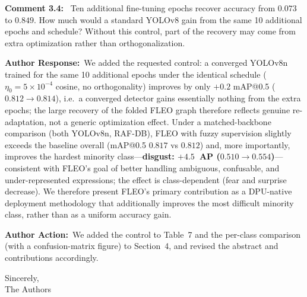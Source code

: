 \documentclass[11pt]{article}
\newcommand{\comment}[1]{\smallskip\noindent\textbf{\color{navy}Comment #1:}\ }
\newcommand{\response}{\smallskip\par\noindent\textbf{\color{steel}Author Response:}\ }
\newcommand{\action}{\smallskip\par\noindent\textbf{\color{steel}Author Action:}\ }
\begin{document}
\comment{3.4} Ten additional fine-tuning epochs recover accuracy from $0.073$ to $0.849$. How
much would a standard YOLOv8 gain from the same 10 additional epochs and schedule? Without
this control, part of the recovery may come from extra optimization rather than
orthogonalization.
\response We added the requested control: a converged YOLOv8n trained for the same 10
additional epochs under the identical schedule ($\eta_0=5\times10^{-4}$ cosine, no
orthogonality) improves by only $+0.2$ mAP@0.5 ($0.812\rightarrow0.814$), i.e.\ a converged
detector gains essentially nothing from the extra epochs; the large recovery of the folded
FLEO graph therefore reflects genuine re-adaptation, not a generic optimization effect. Under
a matched-backbone comparison (both YOLOv8n, RAF-DB), FLEO with fuzzy supervision slightly
exceeds the baseline overall (mAP@0.5 $0.817$ vs $0.812$) and, more importantly, improves the
hardest minority class---\textbf{disgust: $+4.5$~AP ($0.510\rightarrow0.554$)}---consistent
with FLEO's goal of better handling ambiguous, confusable, and under-represented expressions;
the effect is class-dependent (fear and surprise decrease). We therefore present FLEO's
primary contribution as a DPU-native deployment methodology that additionally improves the
most difficult minority class, rather than as a uniform accuracy gain.
\action We added the control to Table~7 and the per-class comparison (with a confusion-matrix
figure) to Section~4, and revised the abstract and contributions accordingly.

\bigskip
\noindent Sincerely,\\[2pt]
The Authors
\end{document}

